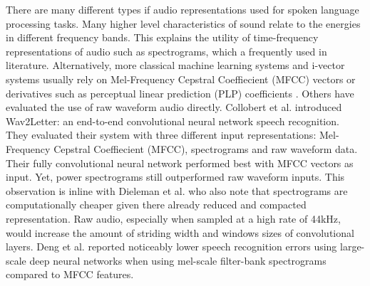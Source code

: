 There are many different types if audio representations used for spoken language processing tasks. Many higher level characteristics of sound relate to the energies in different frequency bands. This explains the utility of time-frequency representations of audio such as spectrograms, which a frequently used in literature.\cite{montavon2009deep, dieleman2013, multiscalelee2009unsupervised, wulfing2012unsupervised, henaff2011unsupervised} Alternatively, more classical machine learning systems and i-vector systems usually rely on Mel-Frequency Cepstral Coeffiecient (MFCC) vectors\cite{richardson2015unified, dehak2011front, garcia2011analysis} or derivatives such as perceptual linear prediction (PLP) coefficients \cite{gonzalez2014automatic}. Others have evaluated the use of raw waveform audio directly.\cite{dieleman2014end, collobert2016wav2letter}
Collobert et al. introduced Wav2Letter\cite{collobert2016wav2letter}: an end-to-end convolutional neural network speech recognition. They evaluated their system with three different input representations: Mel-Frequency Cepstral Coeffiecient (MFCC), spectrograms and raw waveform data. Their fully convolutional neural network performed best with MFCC vectors as input. Yet, power spectrograms still outperformed raw waveform inputs. This observation is inline with Dieleman et al.\cite{dieleman2014end} who also note that spectrograms are computationally cheaper given there already reduced and compacted representation. Raw audio, especially when sampled at a high rate of 44kHz, would increase the amount of striding width and windows sizes of convolutional layers.  
Deng et al. \cite{deng2013recent} reported noticeably lower speech recognition errors using large-scale deep neural networks when using mel-scale filter-bank spectrograms compared to MFCC features. 


